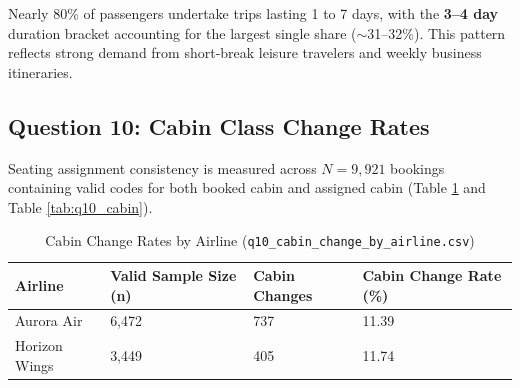 \documentclass[12pt, a4paper]{report}
\newcommand{\code}[1]{\texttt{\small\color{DarkSlate}#1}}
\begin{document}
Nearly 80\% of passengers undertake trips lasting 1 to 7 days, with the \textbf{3--4 day} duration bracket accounting for the largest single share ($\sim$31--32\%). This pattern reflects strong demand from short-break leisure travelers and weekly business itineraries.

\subsection{Question 10: Cabin Class Change Rates}

Seating assignment consistency is measured across $N = 9,921$ bookings containing valid codes for both booked cabin and assigned cabin (Table \ref{tab:q10_airline} and Table \ref{tab:q10_cabin}).

\begin{table}[H]
  \centering
  \caption{Cabin Change Rates by Airline (\code{q10\_cabin\_change\_by\_airline.csv})}
  \label{tab:q10_airline}
  \renewcommand{\arraystretch}{1.3}
  \begin{tabularx}{\textwidth}{l XXX}
    \toprule
    \rowcolor{TableHead}
    \textbf{Airline} & \textbf{Valid Sample Size (n)} & \textbf{Cabin Changes} & \textbf{Cabin Change Rate (\%)} \\
    \midrule
    Aurora Air    & 6,472 & 737 & 11.39 \\
    \rowcolor{TableAlt}
    Horizon Wings & 3,449 & 405 & 11.74 \\
    \bottomrule
  \end{tabularx}
\end{table}
\end{document}
